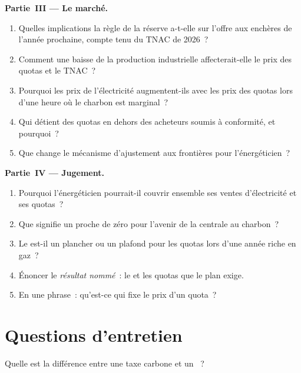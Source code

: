 \begin{problem}
\medskip\noindent\textbf{Partie~III --- Le marché.}
\begin{enumerate}[resume]
\item Quelles implications la règle de la réserve a-t-elle sur l'offre aux enchères de l'année prochaine, compte tenu du TNAC de 2026~?
\item Comment une baisse de la production industrielle affecterait-elle le prix des quotas et le TNAC~?
\item Pourquoi les prix de l'électricité augmentent-ils avec les prix des quotas lors d'une heure où le charbon est marginal~?
\item Qui détient des quotas en dehors des acheteurs soumis à conformité, et pourquoi~?
\item Que change le mécanisme d'ajustement aux frontières pour l'énergéticien~?
\end{enumerate}

\medskip\noindent\textbf{Partie~IV --- Jugement.}
\begin{enumerate}[resume]
\item Pourquoi l'énergéticien pourrait-il couvrir ensemble ses ventes d'électricité et ses quotas~?
\item Que signifie un  proche de zéro pour l'avenir de la centrale au charbon~?
\item Le  est-il un plancher ou un plafond pour les quotas lors d'une année riche en gaz~?
\item Énoncer le \emph{résultat nommé}~: le  et les quotas que le plan exige.
\item En une phrase~: qu'est-ce qui fixe le prix d'un quota~?
\end{enumerate}
\end{problem}

\section{Questions d'entretien}

\begin{interviewq}\label{iq:m3:emissions-and-environmental-markets:1}
Quelle est la différence entre une taxe carbone et un ~?
\end{interviewq}

